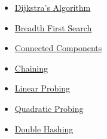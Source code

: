 \newpage
{}



\begin{itemize}
    \item \href{https://gist.github.com/rugbyprof/2c213fc4cd22c7e398e46adac257fd3d}{Dijkstra's Algorithm}
    \item \href{https://gist.github.com/f4a854a92e05726189b859645e7b4609}{Breadth First Search}
    \item \href{https://gist.github.com/051202666be784cdb22e611e75d49ae2}{Connected Components}
    
\end{itemize}


\begin{itemize}
    \item \href{https://gist.github.com/941937bb9a4104a5755e25d4fffc9cf5}{Chaining}
    \item \href{https://gist.github.com/dac58aea2c219efeee56d8d8d9487726}{Linear Probing}
    \item \href{https://gist.github.com/8de53804c1012f558344a5aede2d144d}{Quadratic Probing} 
    \item \href{https://gist.github.com/9cceec8c0653e3ec35ebf726325c5f7d}{Double Hashing}
\end{itemize}
